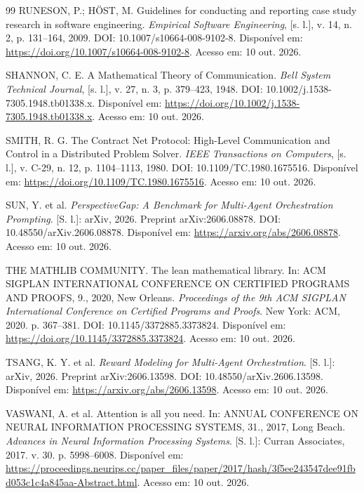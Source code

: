 \begin{thebibliography}{99}
 RUNESON, P.; HÖST, M. Guidelines for conducting and reporting case study research in software engineering. \textit{Empirical Software Engineering}, [s. l.], v. 14, n. 2, p. 131--164, 2009. DOI: 10.1007/s10664-008-9102-8. Disponível em: \url{https://doi.org/10.1007/s10664-008-9102-8}. Acesso em: 10 out. 2026.

 SHANNON, C. E. A Mathematical Theory of Communication. \textit{Bell System Technical Journal}, [s. l.], v. 27, n. 3, p. 379--423, 1948. DOI: 10.1002/j.1538-7305.1948.tb01338.x. Disponível em: \url{https://doi.org/10.1002/j.1538-7305.1948.tb01338.x}. Acesso em: 10 out. 2026.

 SMITH, R. G. The Contract Net Protocol: High-Level Communication and Control in a Distributed Problem Solver. \textit{IEEE Transactions on Computers}, [s. l.], v. C-29, n. 12, p. 1104--1113, 1980. DOI: 10.1109/TC.1980.1675516. Disponível em: \url{https://doi.org/10.1109/TC.1980.1675516}. Acesso em: 10 out. 2026.

 SUN, Y. et al. \textit{PerspectiveGap: A Benchmark for Multi-Agent Orchestration Prompting}. [S. l.]: arXiv, 2026. Preprint arXiv:2606.08878. DOI: 10.48550/arXiv.2606.08878. Disponível em: \url{https://arxiv.org/abs/2606.08878}. Acesso em: 10 out. 2026.

 THE MATHLIB COMMUNITY. The lean mathematical library. In: ACM SIGPLAN INTERNATIONAL CONFERENCE ON CERTIFIED PROGRAMS AND PROOFS, 9., 2020, New Orleans. \textit{Proceedings of the 9th ACM SIGPLAN International Conference on Certified Programs and Proofs}. New York: ACM, 2020. p. 367--381. DOI: 10.1145/3372885.3373824. Disponível em: \url{https://doi.org/10.1145/3372885.3373824}. Acesso em: 10 out. 2026.

 TSANG, K. Y. et al. \textit{Reward Modeling for Multi-Agent Orchestration}. [S. l.]: arXiv, 2026. Preprint arXiv:2606.13598. DOI: 10.48550/arXiv.2606.13598. Disponível em: \url{https://arxiv.org/abs/2606.13598}. Acesso em: 10 out. 2026.

 VASWANI, A. et al. Attention is all you need. In: ANNUAL CONFERENCE ON NEURAL INFORMATION PROCESSING SYSTEMS, 31., 2017, Long Beach. \textit{Advances in Neural Information Processing Systems}. [S. l.]: Curran Associates, 2017. v. 30. p. 5998--6008. Disponível em: \url{https://proceedings.neurips.cc/paper_files/paper/2017/hash/3f5ee243547dee91fbd053c1c4a845aa-Abstract.html}. Acesso em: 10 out. 2026.


\end{thebibliography}
